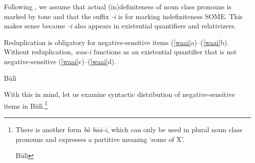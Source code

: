 \documentclass[output=paper,colorlinks,citecolor=brown]{langscibook}
\begin{document}
{}
\z

Following \cite{HiraiwaEtAl2017}, we assume that actual (in)definiteness of noun class pronouns is marked by tone and that the suffix \textit{-i} is for marking indefiniteness SOME. This makes sense because \textit{-i} also appears in existential quantifiers and relativizers.

\z

\z

Reduplication is obligatory for negative-sensitive items (\ref{waai}a)--(\ref{waai}b). Without reduplication, \textit{waa-i} functions as an existential quantifier that is not negative-sensitive (\ref{waai}c)--(\ref{waai}d).






\ea Bùlì \label{waai}
\z
\z

With this in mind, let us examine syntactic distribution of negative-sensitive items in Bùlì.\footnote{There is another form \textit{bà bāā-ī}, which can only be used in plural noun class pronouns and expresses a partitive meaning `some of X'.


\ea Bùlì
\z
\z
}
\end{document}
